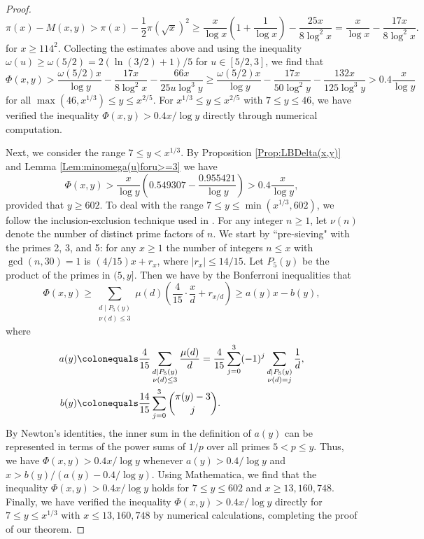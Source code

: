 \documentclass[12pt,reqno]{amsart}
\begin{document}
\begin{proof}
\[\pi(x)-M(x,y)>\pi(x)-\frac{1}{2}\pi\left(\sqrt{x}\right)^2\ge\frac{x}{\log x}\left(1+\frac{1}{\log x}\right)-\frac{25x}{8\log^2x}=\frac{x}{\log x}-\frac{17x}{8\log^2x}.\]
for $x\ge114^2$. Collecting the estimates above and using the inequality $\omega(u)\ge\omega(5/2)=2(\ln(3/2)+1)/5$ for $u\in[5/2,3]$, we find that
\[\Phi(x,y)>\frac{\omega(5/2)x}{\log y}-\frac{17x}{8\log^2x}-\frac{66x}{25u\log^3y}\ge \frac{\omega(5/2)x}{\log y}-\frac{17x}{50\log^2y}-\frac{132x}{125\log^3y}>0.4\frac{x}{\log y}\]
for all $\max(46,x^{1/3})\le y\le x^{2/5}$. For $x^{1/3}\le y\le x^{2/5}$ with $7\le y\le 46$, we have verified the inequality $\Phi(x,y)>0.4x/\log y$ directly through numerical computation.
\par Next, we consider the range $7\le y<x^{1/3}$. By Proposition \ref{Prop:LBDelta(x,y)} and Lemma \ref{Lem:minomega(u)foru>=3} we have
\[\Phi(x,y)>\frac{x}{\log y}\left(0.549307-\frac{0.955421}{\log y}\right)>0.4\frac{x}{\log y},\]
provided that $y\ge 602$. To deal with the range $7\le y\le \min(x^{1/3},602)$, we follow the inclusion-exclusion technique used in \cite[Section 3]{FP}. For any integer $n\ge1$, let $\nu(n)$ denote the number of distinct prime factors of $n$. We start by ``pre-sieving" with the primes 2, 3, and 5: for any $x\ge1$ the number of integers
$n\le x$ with $\gcd(n,30)=1$ is $(4/15)x+r_x$, where $|r_x|\le14/15$. Let $P_5(y)$ be the product of the primes in $(5,y]$.  Then we have by the Bonferroni inequalities that
\[\Phi(x,y)\ge\sum_{\substack{d\mid P_5(y)\\\nu(d)\le3}}\mu(d)\left(\frac{4}{15}\cdot\frac{x}{d}+r_{x/d}\right)\ge a(y)x-b(y),\]
where
\begin{align*}
a(y)&\colonequals\frac{4}{15}\sum_{\substack{d\mid P_5(y)\\\nu(d)\le3}}\frac{\mu(d)}{d}=\frac{4}{15}\sum_{j=0}^3(-1)^j\sum_{\substack{d\mid P_5(y)\\\nu(d)=j}}\frac{1}{d},\\
b(y)&\colonequals\frac{14}{15}\sum_{j=0}^{3}\binom{\pi(y)-3}{j}.
\end{align*}
By Newton's identities, the inner sum in the definition of $a(y)$ can be represented in terms of the power sums of $1/p$ over all primes $5<p\le y$. Thus, we have $\Phi(x,y)>0.4x/\log y$ whenever $a(y)>0.4/\log y$ and $x> b(y)/(a(y)-0.4/\log y)$. Using Mathematica, we find that the inequality $\Phi(x,y)>0.4x/\log y$ holds for $7\le y\le 602$ and $x\ge 13{,}160{,}748$. Finally, we have verified the inequality $\Phi(x,y)>0.4x/\log y$ directly for $7\le y\le x^{1/3}$ with $x\le13{,}160{,}748$ by numerical calculations, completing the proof of our theorem.
\end{proof}
\end{document}
